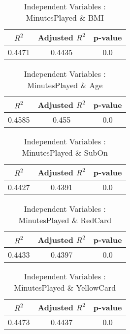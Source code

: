 \documentclass[12pt]{article}
\begin{document}
\hfill
\begin{minipage}{0.4\textwidth}
	\begin{table}[H]
		\centering
		\caption{Independent Variables : MinutesPlayed \& BMI}\label{table:1a}
		{\begin{tabular}{|c|c|c|}
				\hline
				$ R^2 $ & Adjusted $ R^2 $ & p-value \\
				\hline
				0.4471 & 0.4435 & 0.0 \\
				\hline
			\end{tabular}
		}
	\end{table}
\end{minipage}
\hfill
\begin{minipage}{0.4\textwidth}
	\begin{table}[H]
		\centering
		\caption{Independent Variables : MinutesPlayed \& Age}\label{table:1a}
		{\begin{tabular}{|c|c|c|}
				\hline
				$ R^2 $ & Adjusted $ R^2 $ & p-value \\
				\hline
				0.4585 & 0.455 & 0.0 \\
				\hline
			\end{tabular}
		}
	\end{table}
\end{minipage}
\hfill
\begin{minipage}{0.4\textwidth}
	\begin{table}[H]
		\centering
		\caption{Independent Variables : MinutesPlayed \& SubOn}\label{table:1a}
		{\begin{tabular}{|c|c|c|}
				\hline
				$ R^2 $ & Adjusted $ R^2 $ & p-value \\
				\hline
				0.4427 & 0.4391 & 0.0 \\
				\hline
			\end{tabular}
		}
	\end{table}
\end{minipage}
\hfill
\begin{minipage}{0.4\textwidth}
	\begin{table}[H]
		\centering
		\caption{Independent Variables : MinutesPlayed \& RedCard}\label{table:1a}
		{\begin{tabular}{|c|c|c|}
				\hline
				$ R^2 $ & Adjusted $ R^2 $ & p-value \\
				\hline
				0.4433 & 0.4397 & 0.0 \\
				\hline
			\end{tabular}
		}
	\end{table}
\end{minipage}
\hfill
\begin{minipage}{0.4\textwidth}
	\begin{table}[H]
		\centering
		\caption{Independent Variables : MinutesPlayed \& YellowCard}\label{table:1a}
		{\begin{tabular}{|c|c|c|}
				\hline
				$ R^2 $ & Adjusted $ R^2 $ & p-value \\
				\hline
				0.4473 & 0.4437 & 0.0 \\
				\hline
			\end{tabular}
		}
	\end{table}
\end{minipage}
\end{document}
